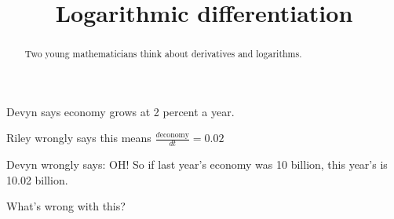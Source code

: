 \documentclass{ximera}
\title[Break-Ground:]{Logarithmic differentiation}
\begin{document}
\begin{abstract}
Two young mathematicians think about derivatives and logarithms.
\end{abstract}
\maketitle

Devyn says economy grows at 2 percent a year.

Riley wrongly says this means $\frac{d\mbox{economy}}{dt} = 0.02$

Devyn wrongly says: OH!  So if last year's economy was 10 billion, this year's is 10.02 billion.

What's wrong with this?







\end{document}
